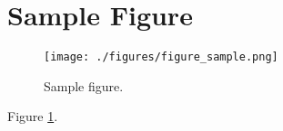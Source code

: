 
\section{Sample Figure}

\begin{figure}[htb]
\texttt{[image: ./figures/figure\_sample.png]}
\caption{Sample figure.}
\label{figure_sample}
\end{figure}

Figure \ref{figure_sample}.
